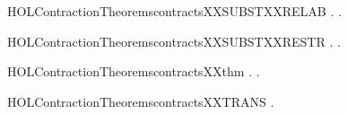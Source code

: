 \newcommand{\HOLContractionTheoremscontractsXXSUBSTXXPREFIX}{\UseVerbatim{HOLContractionTheoremscontractsXXSUBSTXXPREFIX}}
\begin{SaveVerbatim}{HOLContractionTheoremscontractsXXSUBSTXXRELAB}
\HOLTokenTurnstile{} \HOLSymConst{\HOLTokenForall{}} .    \HOLSymConst{\HOLTokenImp{}} \HOLSymConst{\HOLTokenForall{}}.       
\end{SaveVerbatim}
\newcommand{\HOLContractionTheoremscontractsXXSUBSTXXRELAB}{\UseVerbatim{HOLContractionTheoremscontractsXXSUBSTXXRELAB}}
\begin{SaveVerbatim}{HOLContractionTheoremscontractsXXSUBSTXXRESTR}
\HOLTokenTurnstile{} \HOLSymConst{\HOLTokenForall{}} .    \HOLSymConst{\HOLTokenImp{}} \HOLSymConst{\HOLTokenForall{}}. \HOLConst{\ensuremath{\nu}}    \HOLConst{\ensuremath{\nu}}  
\end{SaveVerbatim}
\newcommand{\HOLContractionTheoremscontractsXXSUBSTXXRESTR}{\UseVerbatim{HOLContractionTheoremscontractsXXSUBSTXXRESTR}}
\begin{SaveVerbatim}{HOLContractionTheoremscontractsXXthm}
\HOLTokenTurnstile{} \HOLSymConst{\HOLTokenForall{}} .    \HOLSymConst{\HOLTokenEquiv{}} \HOLSymConst{\HOLTokenExists{}}.    \HOLSymConst{\HOLTokenConj{}}  
\end{SaveVerbatim}
\newcommand{\HOLContractionTheoremscontractsXXthm}{\UseVerbatim{HOLContractionTheoremscontractsXXthm}}
\begin{SaveVerbatim}{HOLContractionTheoremscontractsXXTRANS}
\HOLTokenTurnstile{} \HOLSymConst{\HOLTokenForall{}}  .    \HOLSymConst{\HOLTokenConj{}}    \HOLSymConst{\HOLTokenImp{}}   
\end{SaveVerbatim}
\newcommand{\HOLContractionTheoremscontractsXXTRANS}{\UseVerbatim{HOLContractionTheoremscontractsXXTRANS}}
